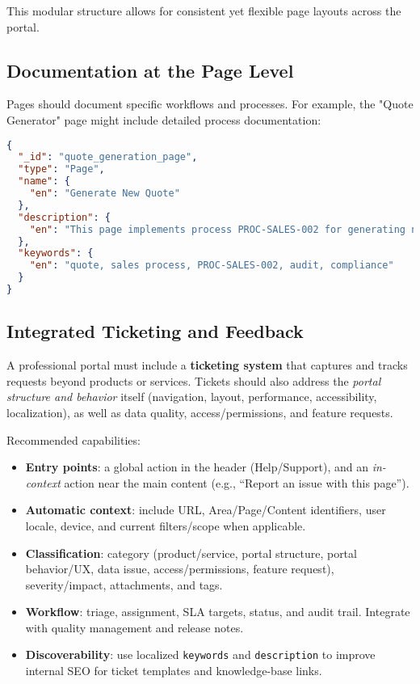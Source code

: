 This modular structure allows for consistent yet flexible page layouts across the portal.

\subsection{Documentation at the Page Level}
\label{sec:page-documentation}

Pages should document specific workflows and processes. For example, the "Quote Generator" page might include detailed process documentation:

\begin{lstlisting}[language=JSON,caption={Page with Process Documentation},label={lst:process-page-docs}]
{
  "_id": "quote_generation_page",
  "type": "Page",
  "name": {
    "en": "Generate New Quote"
  },
  "description": {
    "en": "This page implements process PROC-SALES-002 for generating new customer quotes. The process requires completion of the customer information form and selection of products from the official catalog. All generated quotes must be approved by a sales manager before being sent to the customer. This process is audited quarterly under audit procedure AUD-Q-004."
  },
  "keywords": {
    "en": "quote, sales process, PROC-SALES-002, audit, compliance"
  }
}
\end{lstlisting}

\subsection{Integrated Ticketing and Feedback}
\label{sec:ticketing}

A professional portal must include a \textbf{ticketing system} that captures and tracks requests beyond products or services. Tickets should also address the \emph{portal structure and behavior} itself (navigation, layout, performance, accessibility, localization), as well as data quality, access/permissions, and feature requests.

Recommended capabilities:
\begin{itemize}
  \item \textbf{Entry points}: a global action in the header (Help/Support), and an \emph{in-context} action near the main content (e.g., “Report an issue with this page”).
  \item \textbf{Automatic context}: include URL, Area/Page/Content identifiers, user locale, device, and current filters/scope when applicable.
  \item \textbf{Classification}: category (product/service, portal structure, portal behavior/UX, data issue, access/permissions, feature request), severity/impact, attachments, and tags.
  \item \textbf{Workflow}: triage, assignment, SLA targets, status, and audit trail. Integrate with quality management and release notes.
  \item \textbf{Discoverability}: use localized \texttt{keywords} and \texttt{description} to improve internal SEO for ticket templates and knowledge-base links.
\end{itemize}

